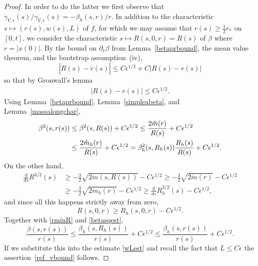\documentclass[10pt,a4paper]{amsart}
\begin{document}
\begin{proof}
  In order to do the latter we first observe that
  $\dot\gamma_{V,\epsilon}(s)/\gamma_{V,\epsilon}(s)= - \beta_h(s,r)/r$.
  In addition to the characteristic $s\mapsto (r(s),w(s),L)$ of $f$,
  for which we may assume that $r(s)\geq \frac{1}{2}r_\ast$ on
  $[0,t]$, we consider the characteristic $s\mapsto R(s,0,r) =R(s)$ of $\beta$
  where $r=|x(0)|$.
  By the bound on $\partial_r\beta$ from Lemma~\ref{betaprbound}, the mean value
  theorem, and the bootstrap assumption~(iv),
  \[
  |\dot R(s) - \dot r(s)| \leq C \epsilon^{1/2} + C |R(s) - r(s)|
  \]
  so that by Gronwall's lemma
  \begin{align}\label{rminR}
    |R(s) - r(s)| \leq C \epsilon^{1/2}.
  \end{align}
  Using Lemma~\ref{betaprbound}, Lemma~\ref{simpleabeta},
  and Lemma~\ref{massalongchar},
  \begin{align} \label{betasqest}
    \beta^2(s,r(s))
    &
    \leq \beta^2(s,R(s)) + C \epsilon^{1/2}
    \leq \frac{2 \mathring m (r)}{R(s)} + C \epsilon^{1/2} \notag \\
    &
    \leq \frac{2 \mathring m_h (r)}{R(s)} + C \epsilon^{1/2}
    = \beta_h^2 (s,R_h(s)) \frac{R_h(s)}{R(s)} + C \epsilon^{1/2}.
  \end{align}
  On the other hand,
  \begin{align*}
    \frac{d}{ds} R^{3/2}(s)
    &\geq
    - \frac{3}{2} \sqrt{2m(s,R(s))} - C \epsilon^{1/2}
    \geq
    - \frac{3}{2} \sqrt{2\mathring m(r)} - C \epsilon^{1/2}\\
    &\geq
    - \frac{3}{2} \sqrt{2\mathring m_h(r)} - C \epsilon^{1/2}
     \geq
    \frac{d}{ds} R_h^{3/2}(s) - C \epsilon^{1/2},
  \end{align*}
  and since all this happens strictly away from zero,
  \[
  R(s,0,r) \geq R_h (s,0,r)- C \epsilon^{1/2}.
  \]
  Together with \eqref{rminR} and \eqref{betasqest},
  \[
  \frac{\beta(s,r(s))}{r(s)} \leq
  \frac{\beta_h(s,R_h(s))}{r(s)} + C \epsilon^{1/2}
  \leq %
  \frac{\beta_h(s,r(s))}{r(s)} + C \epsilon^{1/2}.
  \]
  If we substitute this into the estimate \eqref{wLest} and recall the fact that
  $L\leq C \epsilon$ the assertion~\eqref{ref_vbound} follows.  
\end{proof}
\end{document}
